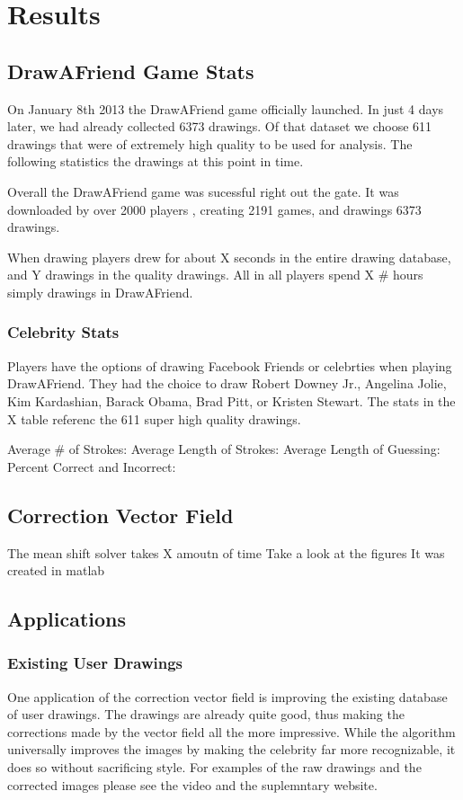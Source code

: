 \section{Results}
\subsection{DrawAFriend Game Stats}
On January 8th 2013 the DrawAFriend game officially launched. In just 4 days later, we had already collected 6373 drawings. Of that dataset we choose 611 drawings that were of extremely high quality to be used for analysis.  The following statistics the drawings at this point in time. 

Overall the DrawAFriend game was sucessful right out the gate. It was downloaded by over 2000 players , creating 2191 games, and drawings 6373 drawings. 

When drawing players drew for about X seconds in the entire drawing database, and Y drawings in the quality drawings. All in all players spend X # hours simply drawings in DrawAFriend.

\subsubsection{Celebrity Stats}
Players have the options of drawing Facebook Friends or celebrties when playing DrawAFriend. They had the choice to draw Robert Downey Jr., Angelina Jolie, Kim Kardashian, Barack Obama, Brad Pitt, or Kristen Stewart. The stats in the X table referenc the 611 super high quality drawings.

Average # of Strokes:
Average Length of Strokes:
Average Length of Guessing: 
Percent Correct and Incorrect: 

\subsection {Correction Vector Field}
The mean shift solver takes X amoutn of time 
Take a look at the figures
It was created in matlab

\subsection {Applications}
\subsubsection{Existing User Drawings}
One application of the correction vector field is improving the existing database of user drawings. The drawings are already quite good, thus making the corrections made by the vector field all the more impressive.  While the algorithm universally improves the images by making the celebrity far more recognizable, it does so without sacrificing style. For examples of the raw drawings and the corrected images please see the video and the suplemntary website.

